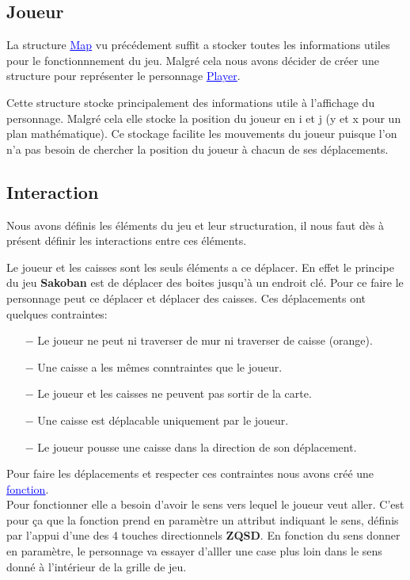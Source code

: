 \documentclass[french, 12pt]{article}
\begin{document}
    \subsection{Joueur}
        La structure \href{../doc/html/struct_map.html}{\textcolor{blue}{\underline{Map}}} vu précédement suffit a stocker toutes les informations utiles pour le fonctionnnement du jeu. Malgré cela nous avons décider de créer une structure pour représenter le personnage \href{../doc/html/struct_player.html}{\textcolor{blue}{\underline{Player}}}.

        Cette structure stocke principalement des informations utile à l'affichage du personnage. Malgré cela elle stocke la position du joueur en i et j (y et x pour un plan mathématique). Ce stockage facilite les mouvements du joueur puisque l'on n'a pas besoin de chercher la position du joueur à chacun de ses déplacements.

    \subsection{Interaction}
        Nous avons définis les éléments du jeu et leur structuration, il nous faut dès à présent définir les interactions entre ces éléments.

        Le joueur et les caisses sont les seuls éléments a ce déplacer. En effet le principe du jeu \textbf{Sakoban} est de déplacer des boites jusqu'à un endroit clé. Pour ce faire le personnage peut ce déplacer et déplacer des caisses. Ces déplacements ont quelques contraintes:

        \begin{itemize}
            \item[$-$] Le joueur ne peut ni traverser de mur ni traverser de caisse (orange).
            \item[$-$] Une caisse a les mêmes conntraintes que le joueur.
            \item[$-$] Le joueur et les caisses ne peuvent pas sortir de la carte.
            \item[$-$] Une caisse est déplacable uniquement par le joueur.
            \item[$-$] Le joueur pousse une caisse dans la direction de son déplacement.
        \end{itemize}

        Pour faire les déplacements et respecter ces contraintes nous avons créé une \href{../doc/html/move_8h.html}{\textcolor{blue}{\underline{fonction}}}. \\
        Pour fonctionner elle a besoin d'avoir le sens vers lequel le joueur veut aller. C'est pour ça que la fonction prend en paramètre un attribut indiquant le sens, définis par l'appui d'une des 4 touches directionnels \textbf{ZQSD}. En fonction du sens donner en paramètre, le personnage va essayer d'alller une case plus loin dans le sens donné à l'intérieur de la grille de jeu. 
\end{document}
